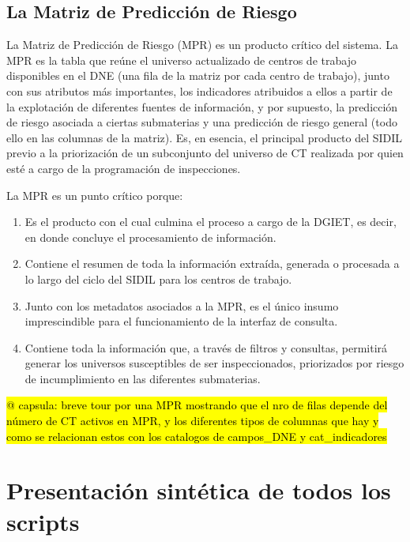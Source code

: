 \documentclass[
]{article}
\begin{document}
\hypertarget{la-matriz-de-predicciuxf3n-de-riesgo}{%
\subsection{La Matriz de Predicción de Riesgo}\label{la-matriz-de-predicciuxf3n-de-riesgo}}

La Matriz de Predicción de Riesgo (MPR) es un producto crítico del sistema. La MPR es la tabla que reúne el universo actualizado de centros de trabajo disponibles en el DNE (una fila de la matriz por cada centro de trabajo), junto con sus atributos más importantes, los indicadores atribuidos a ellos a partir de la explotación de diferentes fuentes de información, y por supuesto, la predicción de riesgo asociada a ciertas submaterias y una predicción de riesgo general (todo ello en las columnas de la matriz). Es, en esencia, el principal producto del SIDIL previo a la priorización de un subconjunto del universo de CT realizada por quien esté a cargo de la programación de inspecciones.

La MPR es un punto crítico porque:

\begin{enumerate}
\def\labelenumi{\arabic{enumi})}
\item
  Es el producto con el cual culmina el proceso a cargo de la DGIET, es decir, en donde concluye el procesamiento de información.
\item
  Contiene el resumen de toda la información extraída, generada o procesada a lo largo del ciclo del SIDIL para los centros de trabajo.
\item
  Junto con los metadatos asociados a la MPR, es el único insumo imprescindible para el funcionamiento de la interfaz de consulta.
\item
  Contiene toda la información que, a través de filtros y consultas, permitirá generar los universos susceptibles de ser inspeccionados, priorizados por riesgo de incumplimiento en las diferentes submaterias.
\end{enumerate}

\hl{@\citet{idea} capsula:
breve tour por una MPR mostrando que el nro de filas depende del número de CT activos en MPR, y los diferentes tipos de columnas que hay y como se relacionan estos con los catalogos de campos\_DNE y cat\_indicadores}

\hypertarget{presentaciuxf3n-sintuxe9tica-de-todos-los-scripts}{%
\section{Presentación sintética de todos los scripts}\label{presentaciuxf3n-sintuxe9tica-de-todos-los-scripts}}
\end{document}
